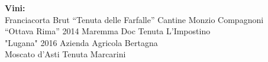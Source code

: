 \documentclass[11pt]{book}
\begin{document}
\vfill
\noindent\scriptsize\textbf{Vini:}\\
Franciacorta Brut “Tenuta delle Farfalle” Cantine Monzio Compagnoni\\
\footnotesize“Ottava Rima” 2014 Maremma Doc Tenuta L’Impostino\\
"Lugana" 2016 Azienda Agricola Bertagna\\
Moscato d’Asti Tenuta Marcarini\\

\begin{figure}[h!]
\centering
\def\svgscale{0.5}
\end{figure}
\end{document}
